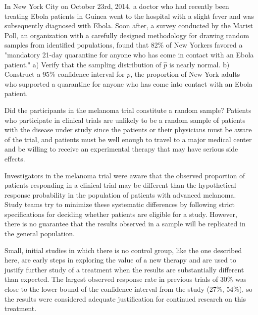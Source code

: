 \textD{\newpage}

\begin{exercisewrap}
\begin{nexercise}
In New York City on October 23rd, 2014, a doctor who had recently been treating Ebola patients in Guinea went to the hospital with a slight fever and was subsequently diagnosed with Ebola. Soon after, a survey conducted by the Marist Poll, an organization with a carefully designed methodology for drawing random samples from identified populations, found that 82\% of New Yorkers favored a "mandatory 21-day quarantine for anyone who has come in contact with an Ebola patient."\footnotemark{} a) Verify that the sampling distribution of $\hat{p}$ is nearly normal. b) Construct a 95\% confidence interval for $p$, the proportion of New York adults who supported a quarantine for anyone who has come into contact with an Ebola patient.\footnotemark{}
\end{nexercise}
\end{exercisewrap}
\addtocounter{footnote}{-1}%
%
\addtocounter{footnote}{1}%

Did the participants in the melanoma trial constitute a random sample?  Patients who participate in clinical trials are unlikely to be a random sample of patients with the disease under study since the patients or their physicians must be aware of the trial, and patients must be well enough to travel to a major medical center and be willing to receive an experimental therapy that may have serious side effects.

Investigators in the melanoma trial were aware that the observed proportion of patients responding in a clinical trial may be different than the hypothetical response probability in the population of patients with advanced melanoma. Study teams try to minimize these systematic differences by following strict specifications for deciding whether patients are eligible for a study. However, there is no guarantee that the results observed in a sample will be replicated in the general population.

Small, initial studies in which there is no control group, like the one described here, are early steps in exploring the value of a new therapy and are used to justify further study of a treatment when the results are substantially different than expected.  The largest observed response rate in previous trials of 30\% was close to the lower bound of the confidence interval from the study (27\%, 54\%), so the results were considered adequate justification for continued research on this treatment.

